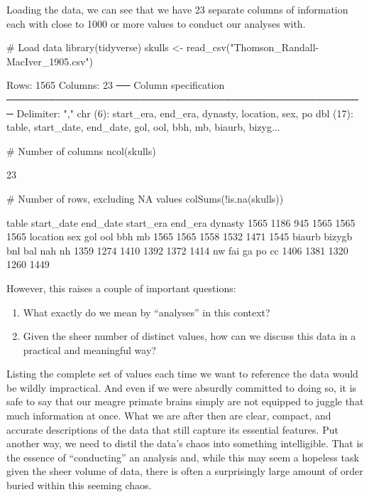 

Loading the data, we can see that we have 23 separate columns of information each with close to 1000 or more values to conduct our analyses with.

\begin{inR}
# Load data
library(tidyverse)
skulls <- read_csv("Thomson_Randall-MacIver_1905.csv")
\end{inR}

\begin{outR}
Rows: 1565 Columns: 23                                                   
── Column specification ───────────────────────────────────────────────────
Delimiter: ","
chr  (6): start_era, end_era, dynasty, location, sex, po
dbl (17): table, start_date, end_date, gol, ool, bbh, mb, biaurb, bizyg...
\end{outR}

\begin{inR}
# Number of columns
ncol(skulls)
\end{inR}
\begin{outR}
[1] 23
\end{outR}

\begin{inR}
# Number of rows, excluding NA values
colSums(!is.na(skulls))
\end{inR}

\begin{outR}
   table start_date   end_date  start_era    end_era    dynasty 
    1565       1186        945       1565       1565       1565 
location        sex        gol        ool        bbh         mb 
    1565       1565       1558       1532       1471       1545 
  biaurb     bizygb        bnl        bal        nah         nh 
    1359       1274       1410       1392       1372       1414 
      nw        fai         ga         po         cc 
    1406       1381       1320       1260       1449 
\end{outR}

\noindent
However, this raises a couple of important questions:

\begin{enumerate}
    \item What exactly do we mean by ``analyses'' in this context?
    \item Given the sheer number of distinct values, how can we discuss this data in a practical and meaningful way?
\end{enumerate}

Listing the complete set of values each time we want to reference the data would be wildly impractical. And even if we were absurdly committed to doing so, it is safe to say that our meagre primate brains simply are not equipped to juggle that much information at once. What we are after then are clear, compact, and accurate descriptions of the data that still capture its essential features. Put another way, we need to distil the data's chaos into something intelligible. That is the essence of ``conducting'' an analysis and, while this may seem a hopeless task given the sheer volume of data, there is often a surprisingly large amount of order buried within this seeming chaos.


